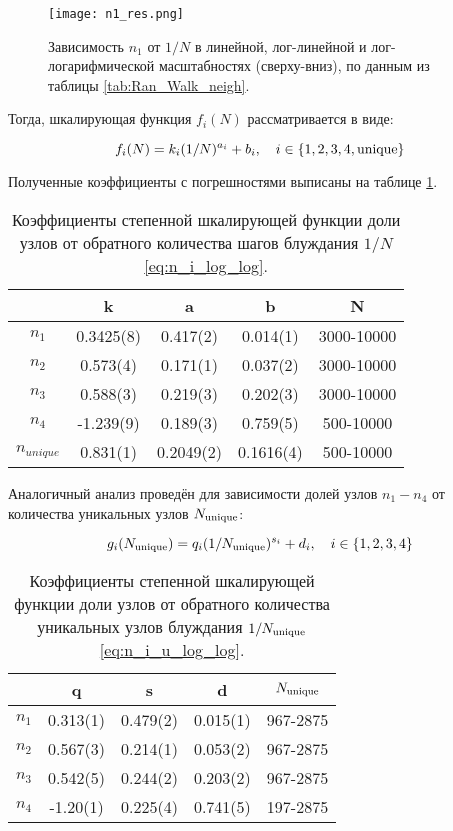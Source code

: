 \begin{figure}
\centering
\texttt{[image: n1\_res.png]}
\caption{Зависимость $n_1$ от $1/N$  в линейной, лог-линейной и лог-логарифмической масштабностях (сверху-вниз), по данным из таблицы \ref{tab:Ran_Walk_neigh}.} 
\label{fig:n1_scale}
\end{figure}

Тогда, шкалирующая функция $f_i(N)$ рассматривается в виде:

\begin{equation}
f_i(N) = k_i (1/N)^{a_i} + b_i,\ \ \ i \in \{1,2,3,4, \textup{unique}\}
\label{eq:n_i_log_log}
\end{equation}

Полученные коэффициенты с погрешностями выписаны на таблице \ref{tab:n_i_log_log}.

\begin{table}[h]
\centering
\begin{tabular}{|c|c|c|c|c|}
\hline
 & k & a & b & N \\ \hline
$n_1$ & 0.3425(8) & 0.417(2) & 0.014(1) & 3000-10000 \\ \hline
$n_2$ & 0.573(4) & 0.171(1) & 0.037(2) & 3000-10000 \\ \hline
$n_3$ & 0.588(3) & 0.219(3) & 0.202(3) & 3000-10000 \\ \hline
$n_4$ & -1.239(9) & 0.189(3) & 0.759(5) & 500-10000 \\ \hline
$n_{unique}$ & 0.831(1) & 0.2049(2) & 0.1616(4) & 500-10000 \\ \hline
\end{tabular}
\caption{Коэффициенты степенной шкалирующей функции доли узлов от обратного количества шагов блуждания $1/N$ \eqref{eq:n_i_log_log}.}
\label{tab:n_i_log_log}
\end{table}
Аналогичный анализ проведён для зависимости долей узлов $n_1 - n_4$ от количества уникальных узлов $N_{\textup{unique}}$:

\begin{equation}
g_i (\Nun) = q_i  (1/\Nun)^{s_i} + d_i,\ \ \ i \in \{1,2,3,4\}
\label{eq:n_i_u_log_log}
\end{equation}

\begin{table}[h]
\centering
\begin{tabular}{|c|c|c|c|c|}
\hline
 & q & s & d & $N_{\textup{unique}}$ \\ \hline
$n_1$ & 0.313(1) & 0.479(2) & 0.015(1) & 967-2875 \\ \hline
$n_2$ & 0.567(3) & 0.214(1) & 0.053(2) & 967-2875 \\ \hline
$n_3$  & 0.542(5) & 0.244(2) & 0.203(2) & 967-2875 \\ \hline
$n_4$ & -1.20(1) & 0.225(4) & 0.741(5) & 197-2875 \\ \hline
\end{tabular} 
\caption{Коэффициенты степенной шкалирующей функции доли узлов от обратного количества уникальных узлов блуждания $1/N_{\textup{unique}}$ \eqref{eq:n_i_u_log_log}.}
\label{tab:n_i_u_log_log}
\end{table}

\newpage 
